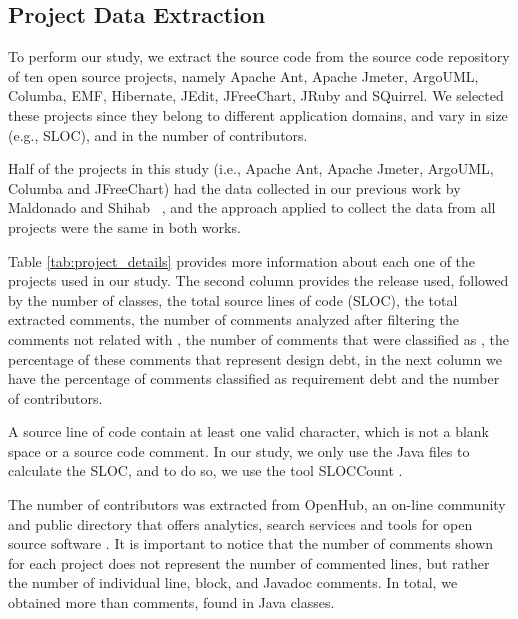 \subsection{Project Data Extraction} %
\label{sub:data_extraction}

To perform our study, we extract the source code from the source code repository of ten open source projects, namely Apache Ant, Apache Jmeter, ArgoUML, Columba, EMF, Hibernate, JEdit, JFreeChart, JRuby and SQuirrel. We selected these projects since they belong to different application domains, and vary in size (e.g., SLOC), and in the number of contributors. 

Half of the projects in this study (i.e., Apache Ant, Apache Jmeter, ArgoUML, Columba and JFreeChart) had the data collected in our previous work by Maldonado and Shihab ~\cite{Maldonado2015MTD}, and the approach applied to collect the data from all projects were the same in both works. 

Table \ref{tab:project_details} provides more information about each one of the projects used in our study. The second column provides the release used, followed by the number of classes, the total source lines of code (SLOC), the total extracted comments, the number of comments analyzed after filtering the comments not related with \SATD, the number of comments that were classified as \SATD, the percentage of these comments that represent design debt, in the next column we have the percentage of \SATD comments classified as requirement debt and the number of contributors. 

A source line of code contain at least one valid character, which is not a blank space or a source code comment. In our study, we only use the Java files to calculate the SLOC, and to do so, we use the tool SLOCCount \cite{wheeler2004:home}. 

The number of contributors was extracted from OpenHub, an on-line community and public directory that offers analytics, search services and tools for open source software \cite{Openhub:home}. It is important to notice that the number of comments shown for each project does not represent the number of commented lines, but rather the number of individual line, block, and Javadoc comments. In total, we obtained more than \todo{} comments, found in \todo{} Java classes.

